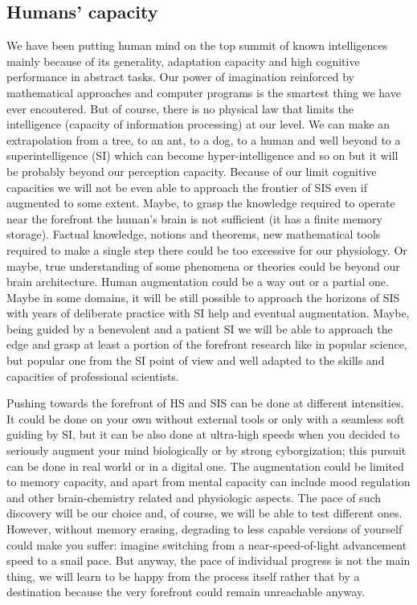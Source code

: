 \documentclass[a4paper,11pt]{article}
\begin{document}
        \subsection{Humans' capacity} %

        We have been putting human mind on the top summit of known intelligences mainly because of its generality, adaptation capacity and high cognitive performance in abstract tasks. Our power of imagination reinforced by mathematical approaches and computer programs is the smartest thing we have ever encoutered. But of course, there is no physical law that limits the intelligence (capacity of information processing) at our level. We can make an extrapolation from a tree, to an ant, to a dog, to a human and well beyond to a superintelligence (SI) which can become hyper-intelligence and so on but it will be probably beyond our perception capacity. Because of our limit cognitive capacities we will not be even able to approach the frontier of SIS even if augmented to some extent. Maybe, to grasp the knowledge required to operate near the forefront the human's brain is not sufficient (it has a finite memory storage). Factual knowledge, notions and theorems, new mathematical tools required to make a single step there could be too excessive for our physiology. Or maybe, true understanding of some phenomena or theories could be beyond our brain architecture. 
        Human augmentation could be a way out or a partial one. Maybe in some domains, it will be still possible to approach the horizons of SIS with years of deliberate practice with SI help and eventual augmentation. Maybe, being guided by a benevolent and a patient SI we will be able to approach the edge and grasp at least a portion of the forefront research like in popular science, but popular one from the SI point of view and well adapted to the skills and capacities of professional scientists.

        Pushing towards the forefront of HS and SIS can be done at different intensities. It could be done on your own without external tools or only with a seamless soft guiding by SI, but it can be also done at ultra-high speeds when you decided to seriously augment your mind biologically or by strong cyborgization; this pursuit can be done in real world or in a digital one. The augmentation could be limited to memory capacity, and apart from mental capacity can include mood regulation and other brain-chemistry related and physiologic aspects. The pace of such discovery will be our choice and, of course, we will be able to test different ones. However, without memory erasing, degrading to less capable versions of yourself could make you suffer: imagine switching from a near-speed-of-light advancement speed to a snail pace. But anyway, the pace of individual progress is not the main thing, we will learn to be happy from the process itself rather that by a destination because the very forefront could remain unreachable anyway.  
\end{document}
